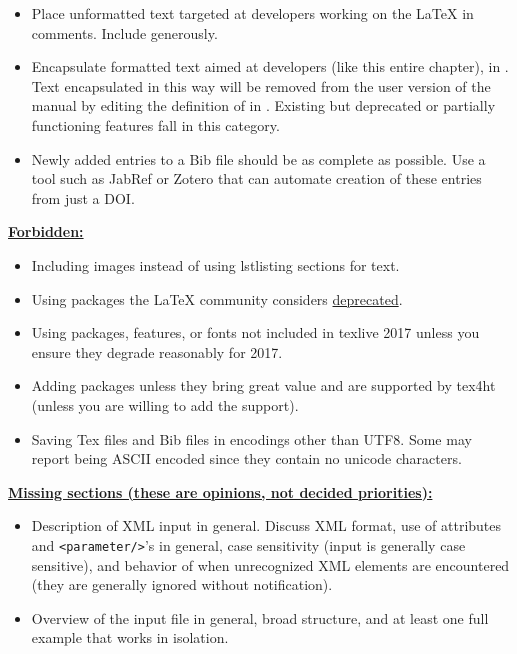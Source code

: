\begin{itemize}
\begin{itemize}
\end{itemize}
\item{Place unformatted text targeted at developers working on the LaTeX in comments.  Include generously.}
\item{Encapsulate formatted text aimed at developers (like this entire chapter), in \ilatex{\\dev\{\}}.  Text encapsulated in this way will be removed from the user version of the manual by editing the definition of \ilatex{\\dev\{\}} in .  Existing but deprecated or partially functioning features fall in this category.}
\item Newly added entries to a Bib file should be as complete as possible. Use a tool such as JabRef or Zotero that can automate creation of these entries from just a DOI.
\end{itemize}

\textbf{\underline{Forbidden:}}
\begin{itemize}
\item Including images instead of using lstlisting sections for text.
\item Using packages the LaTeX community considers \href{https://latex.org/forum/viewtopic.php?f=37&t=6637}{deprecated}.
\item Using packages, features, or fonts not included in texlive 2017 unless you ensure they degrade reasonably for 2017.
\item Adding packages unless they bring great value and are supported by tex4ht (unless you are willing to add the support).
\item Saving Tex files and Bib files in encodings other than UTF8. Some may report being ASCII encoded since they contain no unicode characters.
\end{itemize}


\textbf{\underline{Missing sections (these are opinions, not decided priorities):}}
\begin{itemize}
  \item{Description of XML input in general.  Discuss XML format, use of attributes and \texttt{<parameter/>}'s in general, case sensitivity (input is generally case sensitive), and behavior of \qmcpack when unrecognized XML elements are encountered (they are generally ignored without notification).}
  \item{Overview of the input file in general, broad structure, and at least one full example that works in isolation.}
\end{itemize}


